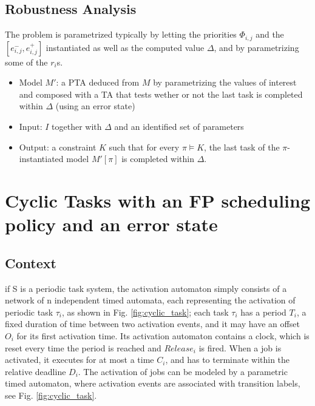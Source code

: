 \documentclass{article}
\begin{document}
\subsection{Robustness Analysis}
The problem is parametrized typically by letting the priorities $\Phi_{i,j}$ and the $[e^{-}_{i,j},e^{+}_{i,j}]$ instantiated as well as the computed value $\Delta$, and by parametrizing some of the $r_i$s.

\begin{itemize}
 \item Model $M'$: a PTA deduced from $M$ by parametrizing the values of interest and composed with a TA that tests wether or not the last task is completed within $\Delta$ (using an error state)
 \item Input: $I$ together with $\Delta$ and an identified set of parameters 
 \item Output: a constraint $K$ such that for every $\pi \models K$, the last task of the $\pi$-instantiated model $M'[\pi]$ is completed within $\Delta$.

\end{itemize}



% 
% 

\section{Cyclic Tasks with an FP scheduling policy and an error state \cite{cpr08,lpprc10}}
\subsection{Context}
if S is a periodic
task system, the activation automaton simply consists of a
network of n independent timed automata, each representing
the activation of periodic task $\tau_i$, as shown in Fig. \ref{fig:cyclic_task}; each task $\tau_i$ has a period $T_i$, a fixed duration of time between
two activation events, and it may have an offset $O_i$ for its first activation time. Its activation automaton contains
a clock, which is reset every time the period is reached
and $Release_i$ is fired.
When a job is activated, it executes
for at most a time $C_i$, and has to terminate within the
relative deadline $D_i$. The activation of jobs can be modeled by a parametric
timed automaton, where activation events are associated with transition labels, see Fig. \ref{fig:cyclic_task}.
\end{document}
